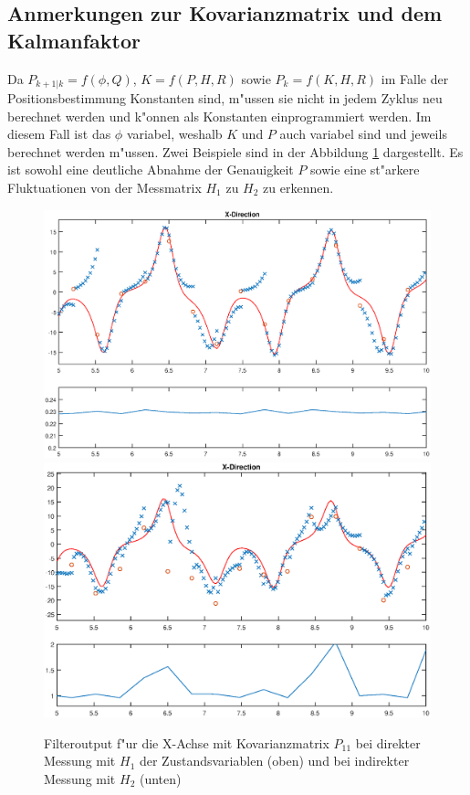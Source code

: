 \begin{refsection}
\subsection{Anmerkungen zur Kovarianzmatrix und dem Kalmanfaktor}
Da $P_{k+1|k}=f(\phi, Q)$, $K=f(P,H,R)$ sowie $P_{k}=f(K,H,R)$ im Falle der Positionsbestimmung Konstanten sind, m"ussen sie nicht in jedem Zyklus neu berechnet werden und k"onnen als Konstanten einprogrammiert werden. Im diesem Fall ist das $\phi$ variabel, weshalb $K$ und $P$ auch variabel sind und jeweils berechnet werden m"ussen. Zwei Beispiele sind in der Abbildung \ref{kalman:Kovarianz} dargestellt. Es ist sowohl eine deutliche Abnahme der Genauigkeit $P$ sowie eine st"arkere Fluktuationen von der Messmatrix $H_{1}$ zu $H_{2}$ zu erkennen.

\begin{figure}
\centering
\includegraphics[width=\hsize]{kalman/figures/H1R10S2XP.eps}
\includegraphics[width=\hsize]{kalman/figures/H2R10S2XP.eps}
\caption{Filteroutput f"ur die X-Achse mit Kovarianzmatrix $P_{11}$ bei direkter Messung mit $H_{1}$ der Zustandsvariablen (oben) und bei indirekter Messung mit $H_{2}$ (unten)}
\label{kalman:Kovarianz}
\end{figure}


\end{refsection}
